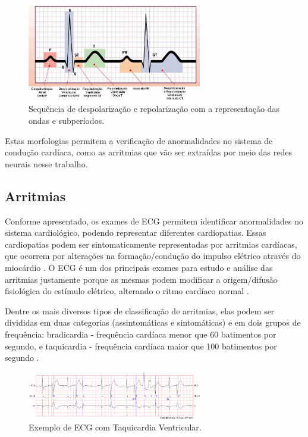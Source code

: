 \documentclass[conference]{IEEEtran}
\begin{document}
\begin{figure}[!h]
	\centering
	\includegraphics[width=3in]{img/sequenciaDespolarizacacoPolarizacao}
	\caption{Sequência de despolarização e repolarização com a representação das ondas e subperíodos.}
	\label{sequenciaDespolarizacacoPolarizacao}
\end{figure}

Estas morfologias permitem a verificação de anormalidades no sistema de condução cardíaca, como as arritmias que vão ser extraídas por meio das redes neurais nesse trabalho.

\subsection{Arritmias}

Conforme apresentado, os exames de ECG permitem identificar anormalidades no sistema cardiológico, podendo representar diferentes cardiopatias. Essas cardiopatias podem ser sintomaticamente representadas por arritmias cardíacas, que ocorrem por alterações na formação/condução do impulso elétrico através do miocárdio \cite{sbc03}. O ECG é um dos principais exames para estudo e análise das arritmias justamente porque as mesmas podem modificar a origem/difusão fisiológica do estímulo elétrico, alterando o ritmo cardíaco normal \cite{goncalves95}.

Dentre os mais diversos tipos de classificação de arritmias, elas podem ser divididas em duas categorias (assintomáticas e sintomáticas) e em dois grupos de frequência: bradicardia - frequência cardíaca menor que 60 batimentos por segundo, e taquicardia - frequência cardíaca maior que 100 batimentos por segundo \cite{guyton06}.

\begin{figure}[!h]
	\centering
	\includegraphics[width=3in]{img/ecgTaquicardiaVentricular}
	\caption{Exemplo de ECG com Taquicardia Ventricular.}
	\label{ecgTaquicardiaVentricular}
\end{figure}
\end{document}
